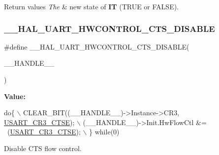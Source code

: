 \begin{DoxyRetVals}{Return values}
{\em The} & new state of {\bfseries IT} (T\+R\+UE or F\+A\+L\+SE). \\
\hline
\end{DoxyRetVals}
\mbox{\label{group___u_a_r_t___exported___macros_ga0a26cb3a576c2700f76a7c697c86a499}} 
\subsubsection{\texorpdfstring{\+\_\+\+\_\+\+H\+A\+L\+\_\+\+U\+A\+R\+T\+\_\+\+H\+W\+C\+O\+N\+T\+R\+O\+L\+\_\+\+C\+T\+S\+\_\+\+D\+I\+S\+A\+B\+LE}{\_\_HAL\_UART\_HWCONTROL\_CTS\_DISABLE}}
{\footnotesize\ttfamily \#define \+\_\+\+\_\+\+H\+A\+L\+\_\+\+U\+A\+R\+T\+\_\+\+H\+W\+C\+O\+N\+T\+R\+O\+L\+\_\+\+C\+T\+S\+\_\+\+D\+I\+S\+A\+B\+LE(\begin{DoxyParamCaption}\item[{}]{\+\_\+\+\_\+\+H\+A\+N\+D\+L\+E\+\_\+\+\_\+ }\end{DoxyParamCaption})}

{\bfseries Value\+:}
\begin{DoxyCode}
\textcolor{keywordflow}{do}\{                                                       \(\backslash\)
    CLEAR\_BIT((\_\_HANDLE\_\_)->Instance->CR3, \hyperlink{group___peripheral___registers___bits___definition_gaa125f026b1ca2d76eab48b191baed265}{USART\_CR3\_CTSE}); \(\backslash\)
    (\_\_HANDLE\_\_)->Init.HwFlowCtl &= ~(\hyperlink{group___peripheral___registers___bits___definition_gaa125f026b1ca2d76eab48b191baed265}{USART\_CR3\_CTSE});      \(\backslash\)
  \} \textcolor{keywordflow}{while}(0)
\end{DoxyCode}


Disable C\+TS flow control. 

